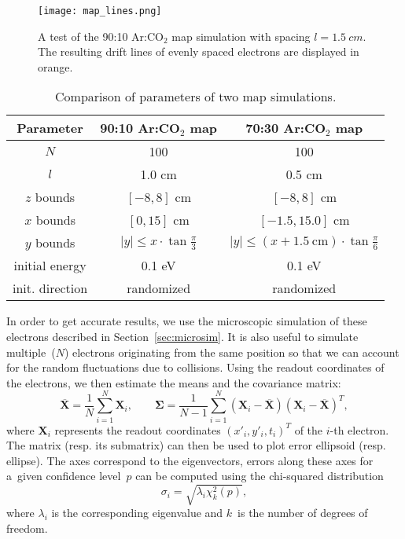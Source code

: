 		\begin{figure}
			\centering
			\texttt{[image: map\_lines.png]}
			\caption{A test of the 90:10 Ar:CO$_2$ map simulation with spacing $l = \SI{1.5}{cm}$. The resulting drift lines of evenly spaced electrons are displayed in orange.}
			\label{fig:maplines}
		\end{figure}
		
		\begin{table}
			\centering
			\caption{Comparison of parameters of two map simulations.}
			{\renewcommand{\arraystretch}{1.2}
			\begin{tabular}{|c|c|c|}
				\hline
				\textbf{Parameter} & \textbf{90:10 Ar:CO$_2$ map} & \textbf{70:30 Ar:CO$_2$ map}\\
				\hline
				$N$ & 100 & 100 \\
				\hline
				$l$ & 1.0 cm & 0.5 cm \\
				\hline
				$z$ bounds & $[-8,8]$ cm & $[-8,8]$ cm \\
				\hline
				$x$ bounds & $[0,15]$ cm & $[-1.5,15.0]$ cm \\
				\hline
				$y$ bounds & $|y| \leq x\cdot\tan\frac{\pi}{3}$ & $|y| \leq (x+\qty{1.5}{\centi\meter})\cdot\tan\frac{\pi}{6}$ \\
				\hline
				initial energy & 0.1 eV & 0.1 eV \\
				\hline
				init. direction & randomized & randomized \\
				\hline
			\end{tabular}}
			\label{tab:map}
		\end{table}
		
		In order to get accurate results, we use the microscopic simulation of these electrons described in Section~\ref{sec:microsim}. It is also useful to simulate multiple~($N$) electrons originating from the same position so that we can account for the random fluctuations due to collisions. Using the readout coordinates of the electrons, we then estimate the means and the covariance matrix:
			\begin{equation}
				\label{eq:cov}
				\mathbf{\overline{X}} = \frac{1}{N}\sum_{i=1}^{N} \mathbf{X}_i,\qquad \mathbf{\Sigma} = \frac{1}{N-1}\sum_{i=1}^{N}(\mathbf{X}_i-\mathbf{\overline{X}})(\mathbf{X}_i-\mathbf{\overline{X}})^T,
			\end{equation}
		where $\mathbf{X}_i$ represents the readout coordinates $(x'_i, y'_i, t_i)^T$ of the $i$\nobreakdash-th electron. The matrix (resp. its submatrix) can then be used to plot error ellipsoid (resp. ellipse). The axes correspond to the eigenvectors, errors along these axes for a~given confidence level~$p$ can be computed using the chi\nobreakdash-squared distribution
			\begin{equation}
				\label{eq:sigma}
				\sigma_i = \sqrt{\lambda_i \chi^2_k(p)},
			\end{equation}
		where $\lambda_i$ is the corresponding eigenvalue and $k$~is the number of degrees of freedom.
		
